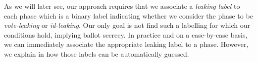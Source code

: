 

As we will later see, our approach requires that we associate a
\emph{leaking label} to each phase which is a binary label indicating
whether we consider the phase to be {\em vote-leaking} or {\em id-leaking}.
Our only goal is not find such a labelling for which our conditions hold, implying
ballot secrecy. 
In practice and on a case-by-case basis, we can 
immediately associate the appropriate leaking label to a phase.
However, we explain in  how those labels can be automatically guessed.




